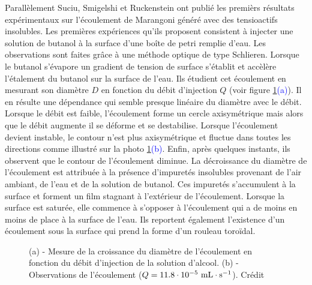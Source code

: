     Parallèlement Suciu, Smigelshi et Ruckenstein \cite{Suciu1967}ont publié les premièrs résultats expérimentaux sur l'écoulement de Marangoni généré avec des tensioactifs insolubles. Les premières expériences qu'ils proposent consistent à injecter une solution de butanol à la surface d'une boîte de petri remplie d'eau. Les observations sont faites grâce à une méthode optique de type Schlieren. Lorsque le butanol s'évapore un gradient de tension de surface s'établit et accèlère l'étalement du butanol sur la surface de l'eau. Ils étudient cet écoulement en mesurant son diamètre $D$ en fonction du débit d'injection $Q$ (voir figure \ref{fig:suciu1967}\textcolor{blue}{(a)}). Il en résulte une dépendance qui semble presque linéaire du diamètre avec le débit.  Lorsque le débit est faible, l'écoulement forme un cercle axisymétrique mais alors que le débit augmente il se déforme et se destabilise. Lorsque l'écoulement devient instable, le contour n'est plus axisymétrique et fluctue dans toutes les directions comme illustré sur la photo \ref{fig:suciu1967}\textcolor{blue}{(b)}. Enfin, après quelques instants, ils observent que le contour de l'écoulement diminue. La décroissance du diamètre de l'écoulement est attribuée à la présence d'impuretés insolubles provenant de l'air ambiant, de l'eau et de la solution de butanol. Ces impuretés s'accumulent à la surface et forment un film stagnant à l'extérieur de l'écoulement. Lorsque la surface est saturée, elle commence à s'opposer à l'écoulement qui a de moins en moins de place à la surface de l'eau. Ils reportent également l'existence d'un écoulement sous la surface qui prend la forme d'un rouleau toroïdal.
  \begin{figure}[!ht]
    \centering
    
    \caption{(a) - Mesure de la croissance du diamètre de l'écoulement en fonction du débit d'injection de la solution d'alcool. (b) - Observations de l'écoulement ($Q = 11.8\cdot 10^{-5}~\rm mL\cdot s^{-1}$). Crédit \cite{Suciu1967}}
    \label{fig:suciu1967}
  \end{figure}
  
